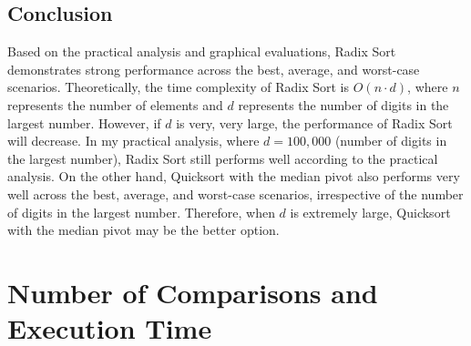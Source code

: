 \documentclass[a4paper,12pt]{report}
\begin{document}
\subsection{Conclusion}
Based on the practical analysis and graphical evaluations, Radix Sort demonstrates strong performance across the best, average, and worst-case scenarios. Theoretically, the time complexity of Radix Sort is \(O(n \cdot d)\), where \(n\) represents the number of elements and \(d\) represents the number of digits in the largest number. However, if \(d\) is very, very large, the performance of Radix Sort will decrease. In my practical analysis, where \(d = 100,000\) (number of digits in the largest number), Radix Sort still performs well according to the practical analysis.
On the other hand, Quicksort with the median pivot also performs very well across the best, average, and worst-case scenarios, irrespective of the number of digits in the largest number. Therefore, when \(d\) is extremely large, Quicksort with the median pivot may be the better option.

\section{Number of Comparisons and Execution Time}
\end{document}
